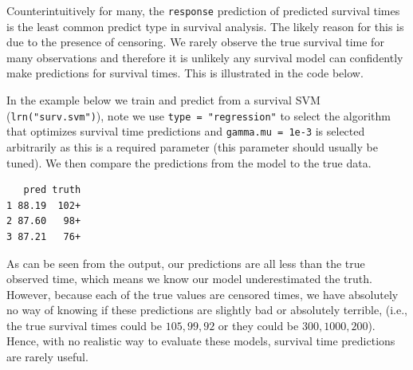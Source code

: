 Counterintuitively for many, the \texttt{response} prediction of
predicted survival times is the least common predict type in survival
analysis. The likely reason for this is due to the presence of
censoring. We rarely observe the true survival time for many
observations and therefore it is unlikely any survival model can
confidently make predictions for survival times. This is illustrated in
the code below.

In the example below we train and predict from a survival
SVM (\texttt{lrn("surv.svm")}),
note we use \texttt{type\ =\ "regression"} to select the algorithm that
optimizes survival time predictions and \texttt{gamma.mu\ =\ 1e-3} is
selected arbitrarily as this is a required parameter (this parameter
should usually be tuned). We then compare the predictions from the model
to the true data.

\begin{Shaded}
\begin{Highlighting}[]
\OtherTok{=} \NormalTok{(}\NormalTok{, } \NormalTok{, } \NormalTok{)}\SpecialCharTok{$}
  \SpecialCharTok{$}\SpecialCharTok{$}\SpecialCharTok{$}
\NormalTok{(}\SpecialCharTok{$}\NormalTok{response[}\SpecialCharTok{:}\NormalTok{],}
  \SpecialCharTok{$}\NormalTok{truth[}\SpecialCharTok{:}\NormalTok{])}
\end{Highlighting}
\end{Shaded}

\begin{verbatim}
   pred truth
1 88.19  102+
2 87.60   98+
3 87.21   76+
\end{verbatim}

As can be seen from the output, our predictions are all less than the
true observed time, which means we know our model underestimated the
truth. However, because each of the true values are censored times, we
have absolutely no way of knowing if these predictions are slightly bad
or absolutely terrible, (i.e., the true survival times could be
\(105, 99, 92\) or they could be \(300, 1000, 200\)). Hence, with no
realistic way to evaluate these models, survival time predictions are
rarely useful.

